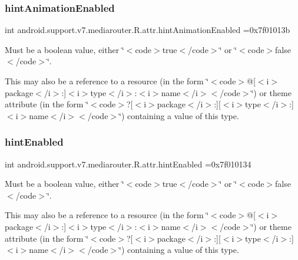 \subsubsection{\texorpdfstring{hint\+Animation\+Enabled}{hintAnimationEnabled}}
{\footnotesize\ttfamily int android.\+support.\+v7.\+mediarouter.\+R.\+attr.\+hint\+Animation\+Enabled =0x7f01013b\hspace{0.3cm}{\ttfamily [static]}}

Must be a boolean value, either \char`\"{}$<$code$>$true$<$/code$>$\char`\"{} or \char`\"{}$<$code$>$false$<$/code$>$\char`\"{}. 

This may also be a reference to a resource (in the form \char`\"{}$<$code$>$@\mbox{[}$<$i$>$package$<$/i$>$\+:\mbox{]}$<$i$>$type$<$/i$>$\+:$<$i$>$name$<$/i$>$$<$/code$>$\char`\"{}) or theme attribute (in the form \char`\"{}$<$code$>$?\mbox{[}$<$i$>$package$<$/i$>$\+:\mbox{]}\mbox{[}$<$i$>$type$<$/i$>$\+:\mbox{]}$<$i$>$name$<$/i$>$$<$/code$>$\char`\"{}) containing a value of this type. \mbox{\label{classandroid_1_1support_1_1v7_1_1mediarouter_1_1R_1_1attr_adb3d7bb0e53eda2fa97659c87c5fb8d1}} 
\subsubsection{\texorpdfstring{hint\+Enabled}{hintEnabled}}
{\footnotesize\ttfamily int android.\+support.\+v7.\+mediarouter.\+R.\+attr.\+hint\+Enabled =0x7f010134\hspace{0.3cm}{\ttfamily [static]}}

Must be a boolean value, either \char`\"{}$<$code$>$true$<$/code$>$\char`\"{} or \char`\"{}$<$code$>$false$<$/code$>$\char`\"{}. 

This may also be a reference to a resource (in the form \char`\"{}$<$code$>$@\mbox{[}$<$i$>$package$<$/i$>$\+:\mbox{]}$<$i$>$type$<$/i$>$\+:$<$i$>$name$<$/i$>$$<$/code$>$\char`\"{}) or theme attribute (in the form \char`\"{}$<$code$>$?\mbox{[}$<$i$>$package$<$/i$>$\+:\mbox{]}\mbox{[}$<$i$>$type$<$/i$>$\+:\mbox{]}$<$i$>$name$<$/i$>$$<$/code$>$\char`\"{}) containing a value of this type. \mbox{\label{classandroid_1_1support_1_1v7_1_1mediarouter_1_1R_1_1attr_ac1d60bd46c49be81b781c430a18125ff}} 
